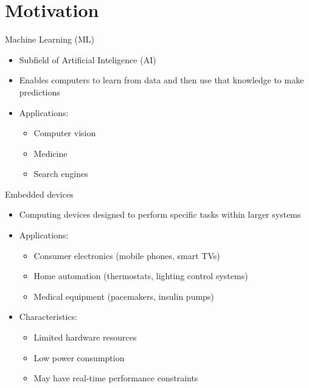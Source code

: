 
\section{Motivation}

\begin{frame}{Machine Learning (ML)}
  \begin{itemize}
	\item Subfield of Artificial Inteligence (AI)
	\item Enables computers to learn from data and then use that knowledge to
	make predictions
	\item Applications:
	  \begin{itemize}
		\item Computer vision
		\item Medicine
		\item Search engines
	  \end{itemize}
  \end{itemize}
\end{frame}

\begin{frame}{Embedded devices}
  \begin{itemize}
	\item Computing devices designed to perform specific tasks within larger systems
	\item Applications:
	  \begin{itemize}
		\item Consumer electronics (mobile phones, smart TVs)
		\item Home automation (thermostats, lighting control systems)
		\item Medical equipment (pacemakers, insulin pumps)
	  \end{itemize}
	\item Characteristics:
	  \begin{itemize}
		\item Limited hardware resources
		\item Low power consumption
		\item May have real-time performance constraints
	  \end{itemize}
  \end{itemize}
\end{frame}

